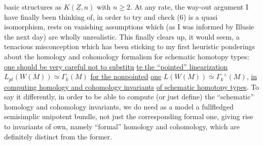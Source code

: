 
basic structures as $K(\underline{Z},n)$ with $n\geqslant 2$. At any rate, the way-out argument
I have finally been thinking of, in order to try and check (6) is a quasi%
isomorphism, rests on vanishing assumptions which (as I was informed by
Illusie the next day) are wholly unrealistic. This finally clears up,
it would seem, a tenacious misconception which has been sticking to my
first heuristic ponderings about the homology and cohomology formalism
for schematic homotopy types: \uline{one should be very careful not to substitu}%
\uline{te the ``pointed'' linearization} $L_{pt}(W(M))\simeq\Gamma_k(M)$ \uline{for the nonpointed}
\uline{one} $L(W(M))\simeq\Gamma_k{}^{\wedge}(M)$, \uline{in computing homology and cohomology invariants}
\uline{of schematic homotopy types}. To say it differently, in order to be
able to  compute (or just define) the ``schematic'' homology and
cohomology invariants, we do need as a model a fullfledged semisimplic
unipotent bundle, not just the corresponding formal one, giving rise
to invariants of  own, namely ``formal'' homology and cohomology,
which are definitely distinct from the former.

